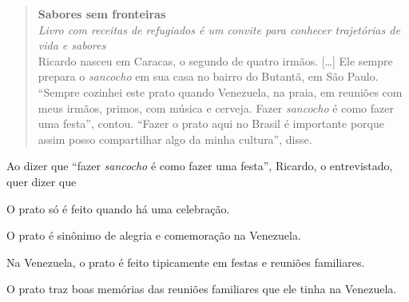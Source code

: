 \begin{quote}
\centering\noindent\textbf{Sabores sem fronteiras}\\

\centering\noindent\emph{Livro com receitas de refugiados é um convite para conhecer
trajetórias de vida e sabores}\\

\noindent Ricardo nasceu em Caracas, o segundo de quatro irmãos. {[}\ldots{]} Ele
sempre prepara o \emph{sancocho} em sua casa no bairro do Butantã, em
São Paulo. ``Sempre cozinhei este prato quando Venezuela, na praia, em
reuniões com meus irmãos, primos, com música e cerveja. Fazer
\emph{sancocho} é como fazer uma festa'', contou. ``Fazer o prato aqui
no Brasil é importante porque assim posso compartilhar algo da minha
cultura'', disse.

\end{quote}

\noindent Ao dizer que ``fazer \emph{sancocho} é como fazer uma festa'', Ricardo,
o entrevistado, quer dizer que

\begin{escolha}
\item O prato só é feito quando há uma celebração.
\item O prato é sinônimo de alegria e comemoração na Venezuela.
\item Na Venezuela, o prato é feito tipicamente em festas e reuniões
familiares.
\item O prato traz boas memórias das reuniões familiares que ele tinha na
Venezuela.
\end{escolha}



